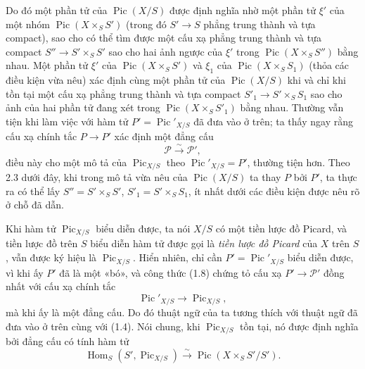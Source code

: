 Do đó một phần tử của $\operatorname{Pic}(X/S)$ được định nghĩa nhờ một phần tử
$\xi'$ của một nhóm $\operatorname{Pic}(X\times_SS')$ (trong đó
$S'\longrightarrow S$ phẳng trung thành và tựa compact), sao cho có thể tìm
được một cấu xạ phẳng trung thành và tựa compact
$S''\longrightarrow S'\times_SS'$ sao cho hai ảnh ngược của $\xi'$ trong
$\operatorname{Pic}(X\times_SS'')$ bằng nhau. Một phần tử $\xi'$ của
$\operatorname{Pic}(X\times_SS')$ và $\xi_1$ của
$\operatorname{Pic}(X\times_SS_1)$ (thỏa các điều kiện vừa nêu) xác định cùng
một phần tử của $\operatorname{Pic}(X/S)$ khi và chỉ khi tồn tại một cấu xạ
phẳng trung thành và tựa compact $S'_1\longrightarrow S'\times_SS_1$ sao cho
ảnh của hai phần tử đang xét trong $\operatorname{Pic}(X\times_SS'_1)$ bằng
nhau. Thường vẫn tiện khi làm việc với hàm tử
$P'=\operatorname{Pic}'_{X/S}$ đã đưa vào ở trên; ta thấy ngay rằng cấu xạ
chính tắc $P\longrightarrow P'$ xác định một đẳng cấu
\begin{equation}
\mathcal P\xrightarrow{\sim}\mathcal P',
\tag{1.8}
\end{equation}
điều này cho một mô tả của $\operatorname{Pic}_{X/S}$ theo
$\operatorname{Pic}'_{X/S}=P'$, thường tiện hơn. Theo 2.3 dưới đây, khi trong
mô tả vừa nêu của $\operatorname{Pic}(X/S)$ ta thay $P$ bởi $P'$, ta thực ra
có thể
lấy $S''=S'\times_SS'$, $S'_1=S'\times_SS_1$, ít nhất dưới các điều kiện được
nêu rõ ở chỗ đã dẫn.

Khi hàm tử $\operatorname{Pic}_{X/S}$ biểu diễn được, ta nói $X/S$ có một tiền
lược đồ Picard, và tiền lược đồ trên $S$ biểu diễn hàm tử được gọi là
\emph{tiền lược đồ Picard} của $X$ trên $S$, vẫn được ký hiệu là
$\operatorname{Pic}_{X/S}$. Hiển nhiên, chỉ cần
$P'=\operatorname{Pic}'_{X/S}$ biểu diễn được, vì khi ấy $P'$ đã là một «bó»,
và công thức (1.8) chứng tỏ cấu xạ $P'\longrightarrow\mathcal P'$ đồng nhất
với cấu xạ chính tắc
\begin{equation}
\operatorname{Pic}'_{X/S}\longrightarrow\operatorname{Pic}_{X/S},
\tag{1.9}
\end{equation}
mà khi ấy là một đẳng cấu. Do đó thuật ngữ của ta tương thích với thuật ngữ đã
đưa vào ở trên cùng với (1.4). Nói chung, khi $\operatorname{Pic}_{X/S}$ tồn
tại, nó được định nghĩa bởi đẳng cấu có tính hàm tử
\begin{equation}
\operatorname{Hom}_S(S',\operatorname{Pic}_{X/S})\xrightarrow{\sim}
\operatorname{Pic}(X\times_SS'/S').
\tag{1.10}
\end{equation}


